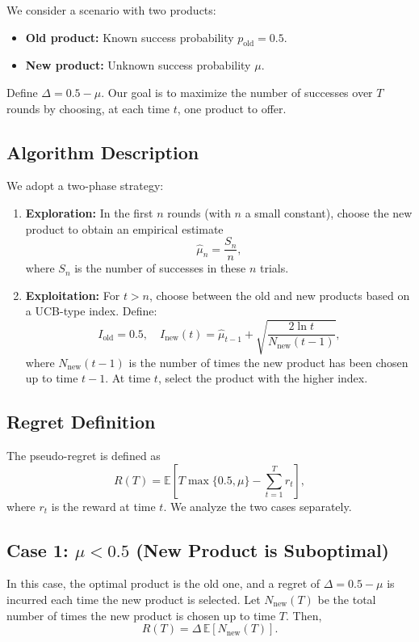 We consider a scenario with two products:
\begin{itemize}
  \item \textbf{Old product:} Known success probability \(p_{\text{old}} = 0.5\).
  \item \textbf{New product:} Unknown success probability \(\mu\).
\end{itemize}
Define \(\Delta = 0.5 - \mu\). Our goal is to maximize the number of successes over \(T\) rounds by choosing, at each time \(t\), one product to offer.

\subsection*{Algorithm Description}

We adopt a two-phase strategy:
\begin{enumerate}
    \item \textbf{Exploration:} In the first \(n\) rounds (with \(n\) a small constant), choose the new product to obtain an empirical estimate
    \[
    \hat{\mu}_n = \frac{S_n}{n},
    \]
    where \(S_n\) is the number of successes in these \(n\) trials.
    
    \item \textbf{Exploitation:} For \(t > n\), choose between the old and new products based on a UCB-type index. Define:
    \[
    I_{\text{old}} = 0.5, \quad
    I_{\text{new}}(t) = \hat{\mu}_{t-1} + \sqrt{\frac{2\ln t}{N_{\text{new}}(t-1)}},
    \]
    where \(N_{\text{new}}(t-1)\) is the number of times the new product has been chosen up to time \(t-1\). At time \(t\), select the product with the higher index.
\end{enumerate}

\subsection*{Regret Definition}

The pseudo-regret is defined as
\[
R(T) = \mathbb{E}\left[T \max\{0.5, \mu\} - \sum_{t=1}^{T} r_t\right],
\]
where \(r_t\) is the reward at time \(t\). We analyze the two cases separately.

\subsection*{Case 1: \(\mu < 0.5\) (New Product is Suboptimal)}

In this case, the optimal product is the old one, and a regret of \(\Delta = 0.5-\mu\) is incurred each time the new product is selected. Let \(N_{\text{new}}(T)\) be the total number of times the new product is chosen up to time \(T\). Then,
\[
R(T) = \Delta\, \mathbb{E}\left[N_{\text{new}}(T)\right].
\]

